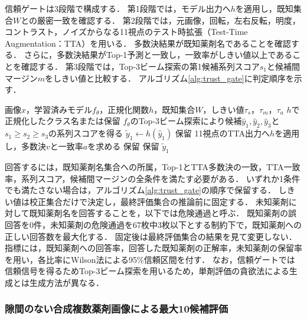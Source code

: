 \documentclass[uplatex,dvipdfmx]{jsarticle}
\begin{document}
信頼ゲートは3段階で構成する．
第1段階では，モデル出力へ$h$を適用し，既知集合$W$との厳密一致を確認する．
第2段階では，元画像，回転，左右反転，明度，コントラスト，ノイズからなる11視点のテスト時拡張（Test-Time Augmentation：TTA）を用いる．
多数決結果が既知薬剤名であることを確認する．
さらに，多数決結果がTop-1予測と一致し，一致率がしきい値以上であることを確認する．
第3段階では，Top-3ビーム探索の第1候補系列スコア$s_1$と候補間マージン$m$をしきい値と比較する．
アルゴリズム\ref{alg:trust_gate}に判定順序を示す．

\begin{algorithm}[H]
  \caption{信頼ゲートによる回答と保留の判定}
  \label{alg:trust_gate}
  \small
  \begin{algorithmic}[1]
    \REQUIRE 画像$x$，学習済みモデル$f_\theta$，正規化関数$h$，既知集合$W$，しきい値$\tau_s$，$\tau_m$，$\tau_a$
    \ENSURE $h$で正規化したクラス名または保留
    \STATE $f_\theta$のTop-3ビーム探索により候補$\hat{y}_1,\hat{y}_2,\hat{y}_3$と$s_1 \geq s_2 \geq s_3$の系列スコアを得る
    \STATE $\tilde{y}_1 \gets h(\hat{y}_1)$
      \RETURN 保留
    \ENDIF
    \STATE 11視点のTTA出力へ$h$を適用し，多数決$v$と一致率$a$を求める
      \RETURN 保留
    \ENDIF
      \RETURN 保留
    \ENDIF
    \RETURN $\tilde{y}_1$
  \end{algorithmic}
\end{algorithm}

\enlargethispage{2\baselineskip}
回答するには，既知薬剤名集合への所属，Top-1とTTA多数決の一致，TTA一致率，系列スコア，候補間マージンの全条件を満たす必要がある．
いずれか1条件でも満たさない場合は，アルゴリズム\ref{alg:trust_gate}の順序で保留する．
しきい値は校正集合だけで決定し，最終評価集合の推論前に固定する．
未知薬剤に対して既知薬剤名を回答することを，以下では危険通過と呼ぶ．
既知薬剤の誤回答を0件，未知薬剤の危険通過を67枚中3枚以下とする制約下で，既知薬剤への正しい回答数を最大化する．
固定後は最終評価集合の結果を見て変更しない．
指標には，既知薬剤への回答率，回答した既知薬剤の正解率，未知薬剤の保留率を用い，各比率にWilson法による95\%信頼区間を付す．
なお，信頼ゲートでは信頼信号を得るためTop-3ビーム探索を用いるため，単剤評価の貪欲法による生成とは生成方法が異なる．

\subsubsection{隙間のない合成複数薬剤画像による最大10候補評価}\label{sec:zero_gap_top10_method}
\end{document}

